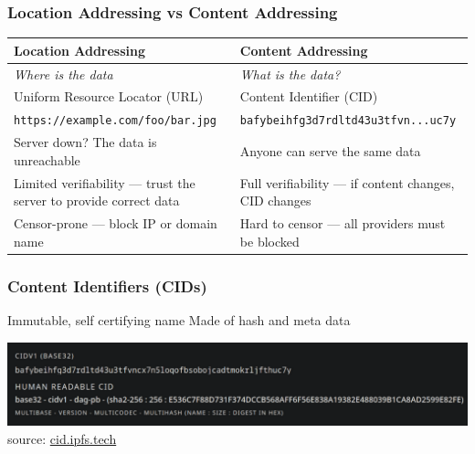 \documentclass{../shipyard-slide}
\begin{document}
\begin{frame}
  \frametitle{Location Addressing vs Content Addressing}
  
\begin{center}
  \renewcommand{\arraystretch}{1.5}
  {\small
  \begin{tabular}{|p{.45\linewidth}|p{.45\linewidth}|}
  \hline
  \large\textbf{Location Addressing} & \large\textbf{Content Addressing} \\ \hline
  \textit{Where is the data} & \textit{What is the data?} \\ \hline
  Uniform Resource Locator (URL) & Content Identifier (CID) \\
  \texttt{https://example.com/foo/bar.jpg} & \texttt{bafybeihfg3d7rdltd43u3tfvn...uc7y} \\ \hline
  Server down? The data is unreachable & Anyone can serve the same data \\ \hline
  Limited verifiability — trust the server to provide correct data & Full verifiability — if content changes, CID changes \\ \hline
  Censor-prone — block IP or domain name & Hard to censor — all providers must be blocked \\ \hline
  \end{tabular}
  }
\end{center}
\end{frame}

\begin{frame}
  \frametitle{Content Identifiers (CIDs)}
  \begin{itemize}
    \itemc Immutable, self certifying name
    \itemc Made of hash and meta data
  \end{itemize}
  \bigskip
  \includegraphics[width=\linewidth]{resources/cid-composition.png}
  {\small source: \url{cid.ipfs.tech}}
\end{frame}
\end{document}
